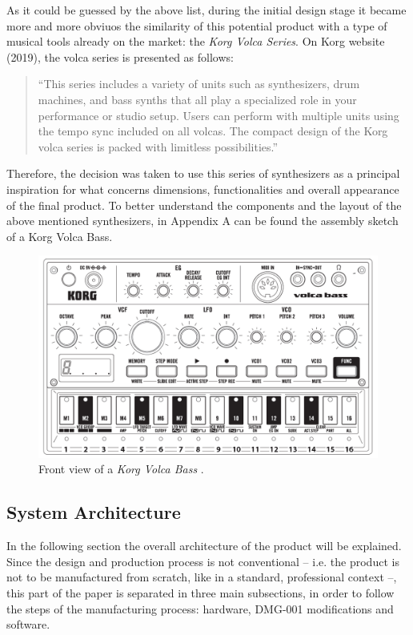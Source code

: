 \documentclass[]{article}
\begin{document}
            As it could be guessed by the above list, during the initial design stage it became more and more obviuos the similarity of this potential product with a 
            type of musical tools already on the market: the \emph{Korg Volca Series}. On Korg website (2019), the volca series is presented as follows: 
            \begin{quote}
                ``This series includes a variety of units such as synthesizers, drum machines, and bass synths that 
                all play a specialized role in your performance or studio setup. Users can perform with multiple units using the tempo sync 
                included on all volcas. The compact design of the Korg volca series 
                is packed with limitless possibilities.'' \cite{KORG2019}
            \end{quote}

            Therefore, the decision was taken to use this series of synthesizers as a principal inspiration for what 
            concerns dimensions, functionalities and overall appearance of the final product. To better understand the 
            components and the layout of the above mentioned synthesizers, in Appendix A can be found the assembly sketch of a Korg Volca Bass. %

            \begin{figure}[h]
                \centering
                \includegraphics[width=\textwidth]{korg-volca-bass.png}
                \caption{Front view of a \emph{Korg Volca Bass} \cite{KORG2013}.}
                \label{fig:volcabass}
                
            \end{figure}

    \subsection{System Architecture}
            In the following section the overall architecture of the product will be explained. Since the design and 
            production process is not conventional -- i.e. the product is not to be manufactured from scratch, like in a 
            standard, professional context --, this part of the paper is separated in three main subsections, in order to 
            follow the steps of the manufacturing process: hardware, DMG-001 modifications and software.
            
\end{document}
